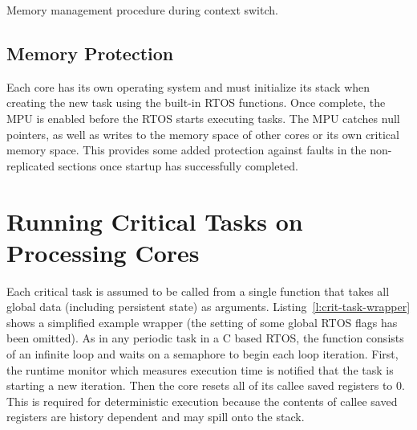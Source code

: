 \begin{algorithm}
\DontPrintSemicolon
	\caption{Memory management procedure during context switch.}
	\label{a:mem-manager}
\end{algorithm}




\subsection{Memory Protection}

Each core has its own operating system and must initialize its stack when creating the new task using the built-in RTOS functions. Once complete, the MPU is enabled before the RTOS starts executing tasks. The MPU catches null pointers, as well as writes to the memory space of other cores or its own critical memory space. This provides some added protection against faults in the non-replicated sections once startup has successfully completed.





\section{Running Critical Tasks on Processing Cores}

Each critical task is assumed to be called from a single function that takes all global data (including persistent state) as arguments. Listing~\ref{l:crit-task-wrapper} shows a simplified example wrapper (the setting of some global RTOS flags has been omitted). As in any periodic task in a C based RTOS, the function consists of an infinite loop and waits on a semaphore to begin each loop iteration. First, the runtime monitor which measures execution time is notified that the task is starting a new iteration. Then the core resets all of its callee saved registers to 0. This is required for deterministic execution because the contents of callee saved registers are history dependent and may spill onto the stack. 


